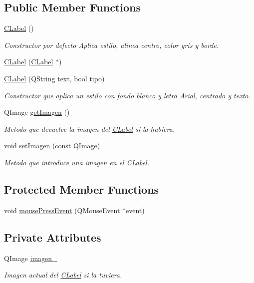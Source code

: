 \subsection*{Public Member Functions}
\begin{DoxyCompactItemize}
\item 
\hyperlink{classCLabel_abf086cf63a3e820257e656e7b608d312}{C\+Label} ()
\begin{DoxyCompactList}\small\item\em Constructor por defecto Aplica estilo, alinea centro, color gris y borde. \end{DoxyCompactList}\item 
\hyperlink{classCLabel_afa6e87f612dcd8c735948903a4d0bdb7}{C\+Label} (\hyperlink{classCLabel}{C\+Label} $\ast$)
\item 
\hyperlink{classCLabel_a2f7accc9637b63d705ba5418240eaf2d}{C\+Label} (Q\+String text, bool tipo)
\begin{DoxyCompactList}\small\item\em Constructor que aplica un estilo con fondo blanco y letra Arial, centrado y texto. \end{DoxyCompactList}\item 
Q\+Image \hyperlink{classCLabel_a79ebc8b728db45da16020cdeb2439625}{get\+Imagen} ()
\begin{DoxyCompactList}\small\item\em Metodo que devuelve la imagen del \hyperlink{classCLabel}{C\+Label} si la hubiera. \end{DoxyCompactList}\item 
void \hyperlink{classCLabel_ac44138a6205fa3b2bc8eee63263e6fc7}{set\+Imagen} (const Q\+Image)
\begin{DoxyCompactList}\small\item\em Metodo que introduce una imagen en el \hyperlink{classCLabel}{C\+Label}. \end{DoxyCompactList}\end{DoxyCompactItemize}
\subsection*{Protected Member Functions}
\begin{DoxyCompactItemize}
\item 
void \hyperlink{classCLabel_a2e57fe98d043e71649079cf190b12ebe}{mouse\+Press\+Event} (Q\+Mouse\+Event $\ast$event)
\end{DoxyCompactItemize}
\subsection*{Private Attributes}
\begin{DoxyCompactItemize}
\item 
Q\+Image \hyperlink{classCLabel_abc23f3746354e8aac57516f34cb85fba}{imagen\+\_\+}
\begin{DoxyCompactList}\small\item\em Imagen actual del \hyperlink{classCLabel}{C\+Label} si la tuviera. \end{DoxyCompactList}\end{DoxyCompactItemize}


